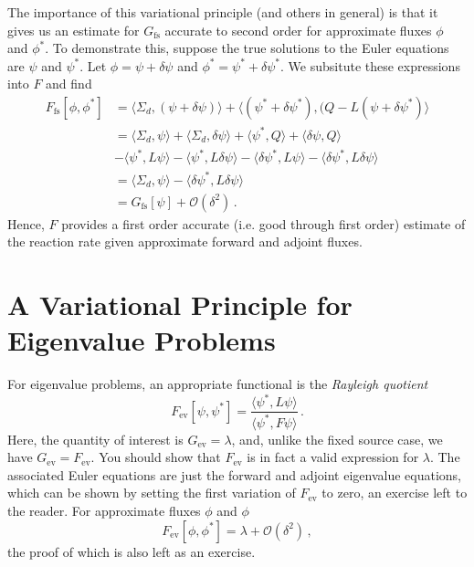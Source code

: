The importance of this variational principle (and others in general) is that 
it gives us an estimate for $G_{\text{fs}}$ accurate to second order for 
approximate fluxes $\phi$ and $\phi^*$.  To demonstrate this, suppose the 
true solutions to the Euler equations are $\psi$ and $\psi^*$.  
Let $\phi = \psi + \delta \psi$ and $\phi^* = \psi^* + \delta \psi^*$.  
We subsitute these expressions into $F$ and find
\begin{equation}
 \begin{split}
    F_{\text{fs}} [\phi,\phi^*] &= 
      \langle \Sigma_d, (\psi+\delta \psi) \rangle + 
      \langle (\psi^*+\delta \psi^*),(Q-L(\psi+\delta \psi^*) \rangle \\
    &= \langle \Sigma_d,\psi \rangle + 
       \langle \Sigma_d, \delta \psi \rangle + 
       \langle \psi^*,Q \rangle + 
       \langle \delta \psi,Q \rangle  \\ 
    &- \langle \psi^*, L\psi \rangle - 
       \langle \psi^*, L\delta \psi \rangle - 
       \langle \delta \psi^*, L\psi \rangle - 
       \langle \delta \psi^*, L\delta \psi \rangle \\
    &= \langle \Sigma_d, \psi \rangle - 
       \langle \delta \psi^*, L\delta \psi \rangle \\
    &= G_{\text{fs}}[\psi] + \mathcal{O}(\delta^2) \, .
 \end{split}
 \label{eq:secondorderfs}
\end{equation}
Hence, $F$ provides a first order accurate (i.e. good through first order) 
estimate of the reaction rate given approximate forward and adjoint fluxes.

\section*{A Variational Principle for Eigenvalue Problems}

For eigenvalue problems, an appropriate functional is 
the \textit{Rayleigh quotient}
\begin{equation}
 F_{\text{ev}}[\psi,\psi^*] = 
   \frac{\langle \psi^*,L\psi \rangle}{ \langle \psi^*, F \psi \rangle } \, .
 \label{eq:rayleigh}
\end{equation}
Here, the quantity of interest is $G_{\text{ev}} = \lambda$, and, unlike the 
fixed source case, we have $G_{\text{ev}} = F_{\text{ev}}$.  You should show 
that $F_{\text{ev}}$ is in fact a valid expression for $\lambda$.  The 
associated Euler equations are just the forward and adjoint eigenvalue 
equations, which can be shown by setting the first variation 
of $F_{\text{ev}}$ to zero, an exercise left to the reader.
For approximate fluxes $\phi$ and $\phi$
\begin{equation}
 F_{\text{ev}}[\phi,\phi^*] = \lambda + \mathcal{O}(\delta^2) \, ,
\end{equation}
the proof of which is also left as an exercise.

